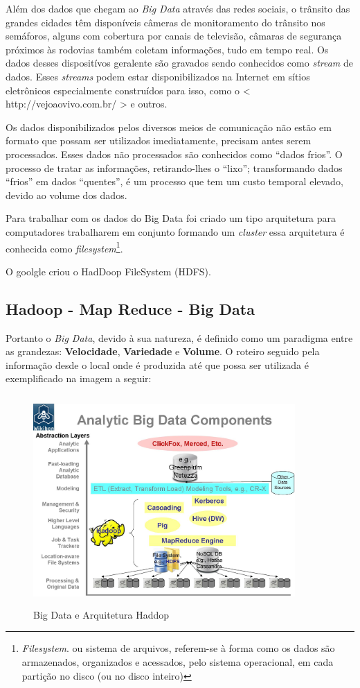 \documentclass[conference,compsoc]{IEEEtran}
\begin{document}
Além dos dados que chegam ao \textit{Big Data} através das redes sociais, o trânsito das grandes cidades têm disponíveis câmeras de monitoramento do trânsito nos semáforos, alguns com cobertura
por canais de televisão, câmaras de segurança próximos às rodovias também coletam informações, tudo em tempo real. Os dados desses dispositívos geralente são gravados sendo conhecidos como \textit{stream} de dados. 
Esses \textit{streams} podem estar disponibilizados na Internet em sítios eletrônicos especialmente construídos para isso, como o
< http://vejoaovivo.com.br/ > e outros.

Os dados disponibilizados pelos diversos meios de comunicação não estão em formato que possam ser utilizados imediatamente, precisam antes serem processados. Esses dados não processados são conhecidos como ``dados frios''.
O processo de tratar as informações, retirando-lhes o ``lixo''; transformando dados ``frios'' em dados ``quentes'', é um processo que tem um custo temporal elevado, devido ao volume dos dados.

Para trabalhar com os dados do Big Data foi criado um tipo arquitetura para computadores trabalharem em conjunto formando um \textit{cluster} essa arquitetura é conhecida como \textit{filesystem}\footnote{\textit{Filesystem}. ou sistema de arquivos, referem-se à forma como os dados são armazenados, organizados e acessados, pelo sistema operacional, em cada partição no disco (ou no disco inteiro)}.

O goolgle criou o \cite{Filesystem} HadDoop FileSystem (HDFS).

\subsection{Hadoop - Map Reduce - Big Data}\label{arte:palavraChave:HadoopMapReduce}

Portanto o \textit{Big Data}, devido à sua natureza, é definido como um paradigma entre as grandezas: \textbf{Velocidade}, \textbf{Variedade} e \textbf{Volume}.
O roteiro seguido pela informação desde o local onde é produzida até que possa ser utilizada é  exemplificado na imagem a seguir:

\begin{figure}[ht]
\centering
\caption{Big Data e Arquitetura Haddop}
\includegraphics[width=100mm, height=80mm]{Figuras/BigDataComponents.jpg}
\end{figure}
\end{document}
